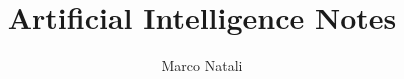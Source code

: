 \documentclass[a4paper, openany]{book}
\theoremstyle{definition}%
\begin{document}
    \title{Artificial Intelligence Notes}
    \author{Marco Natali}
    \date{}
    \maketitle 
  
  \tableofcontents
  \listoffigures

\end{document}
